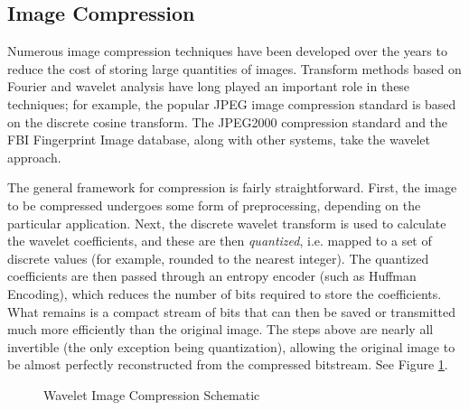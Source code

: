 \subsection*{Image Compression} %

Numerous image compression techniques have been developed over the years to reduce the cost of storing large quantities of images.
Transform methods based on Fourier and wavelet analysis have long played an important role in these techniques; for example, the popular JPEG image compression standard is based on the discrete cosine transform.
The JPEG2000 compression standard and the FBI Fingerprint Image database, along with other systems, take the wavelet approach.

The general framework for compression is fairly straightforward.
First, the image to be compressed undergoes some form of preprocessing, depending on the particular application.
Next, the discrete wavelet transform is used to calculate the wavelet coefficients, and these are then \emph{quantized}, i.e. mapped to a set of discrete values (for example, rounded to the nearest integer).
The quantized coefficients are then passed through an entropy encoder (such as Huffman Encoding), which reduces the number of bits required to store the coefficients.
What remains is a compact stream of bits that can then be saved or transmitted much more efficiently than the original image.
The steps above are nearly all invertible (the only exception being quantization), allowing the original image to be almost perfectly reconstructed from the compressed bitstream.
See Figure \ref{tikz:wsqscheme}.

\begin{figure}[H]
\centering
{}
\caption{Wavelet Image Compression Schematic}
\label{tikz:wsqscheme}
\end{figure}

